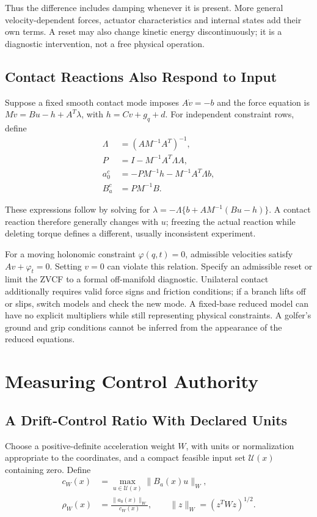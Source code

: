 Thus the difference includes damping whenever it is present. More general velocity-dependent forces, actuator characteristics and internal states add their own terms. A reset may also change kinetic energy discontinuously; it is a diagnostic intervention, not a free physical operation.

\subsection{Contact Reactions Also Respond to Input}
Suppose a fixed smooth contact mode imposes $A\dot v=-b$ and the force equation is $M\dot v=Bu-h+A^T\lambda$, with $h=Cv+g_q+d$. For independent constraint rows, define
\begin{equation}
\begin{aligned}
\Lambda&=(AM^{-1}A^T)^{-1},\\
P&=I-M^{-1}A^T\Lambda A,\\
a_0^c&=-PM^{-1}h-M^{-1}A^T\Lambda b,\\
B_a^c&=PM^{-1}B.
\end{aligned}
\label{eq:ch7:constrained-fields}
\end{equation}

These expressions follow by solving for $\lambda=-\Lambda\{b+AM^{-1}(Bu-h)\}$. A contact reaction therefore generally changes with $u$; freezing the actual reaction while deleting torque defines a different, usually inconsistent experiment.

For a moving holonomic constraint $\varphi(q,t)=0$, admissible velocities satisfy $Av+\varphi_t=0$. Setting $v=0$ can violate this relation. Specify an admissible reset or limit the ZVCF to a formal off-manifold diagnostic. Unilateral contact additionally requires valid force signs and friction conditions; if a branch lifts off or slips, switch models and check the new mode. A fixed-base reduced model can have no explicit multipliers while still representing physical constraints. A golfer's ground and grip conditions cannot be inferred from the appearance of the reduced equations.

\section{Measuring Control Authority}
\label{sec:ch7:authority}

\subsection{A Drift-Control Ratio With Declared Units}
\label{def:ch7:DCR}
Choose a positive-definite acceleration weight $W$, with units or normalization appropriate to the coordinates, and a compact feasible input set $\mathcal U(x)$ containing zero. Define
\begin{equation}
\begin{aligned}
c_W(x)&=\max_{u\in\mathcal U(x)}\|B_a(x)u\|_W,\\
\rho_W(x)&=\frac{\|a_0(x)\|_W}{c_W(x)},\qquad
\|z\|_W=(z^TWz)^{1/2}.
\end{aligned}
\label{eq:ch7:DCR}
\end{equation}

